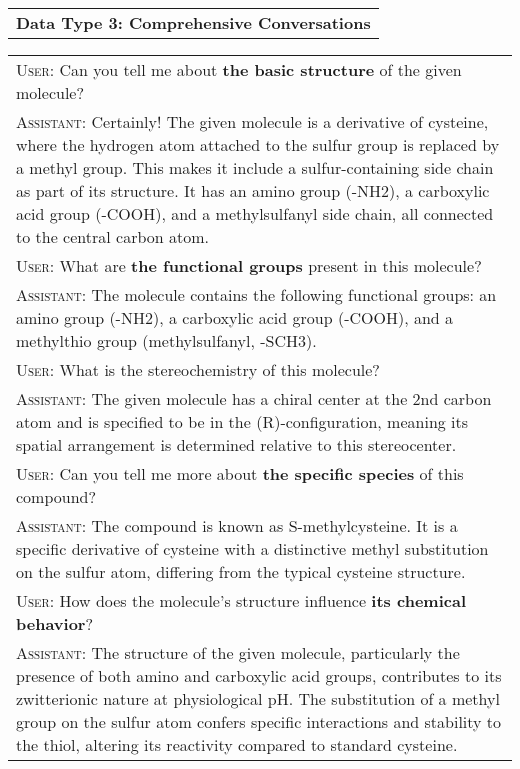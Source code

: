 \begin{table*}[t!]
\begin{tcolorbox}[colframe=gray,colback=white,boxrule=1pt,arc=0.6em,boxsep=0mm,left=5.pt,right=15pt]
\renewcommand{\arraystretch}{1.4}
\begin{tabular}{p{}}
    \textcolor{figgreen}{\textbf{\normalsize{Data Type 3: Comprehensive Conversations}}} \\
\end{tabular}

\renewcommand{\arraystretch}{1.2}
\begin{tabular}{p{}}
\textsc{User}: Can you tell me about\textbf{ the basic structure} of the given molecule?\\
\textsc{Assistant}: Certainly! The given molecule is a derivative of cysteine, where the hydrogen atom attached to the sulfur group is replaced by a methyl group. This makes it include a sulfur-containing side chain as part of its structure. It has an amino group (-NH2), a carboxylic acid group (-COOH), and a methylsulfanyl side chain, all connected to the central carbon atom. \\

\textsc{User}: What are \textbf{the functional groups} present in this molecule? \\
\textsc{Assistant}: The molecule contains the following functional groups: an amino group (-NH2), a carboxylic acid group (-COOH), and a methylthio group (methylsulfanyl, -SCH3). \\

\textsc{User}: What is the stereochemistry of this molecule? \\
\textsc{Assistant}: The given molecule has a chiral center at the 2nd carbon atom and is specified to be in the (R)-configuration, meaning its spatial arrangement is determined relative to this stereocenter. \\

\textsc{User}: Can you tell me more about \textbf{the specific species} of this compound?\\
\textsc{Assistant}: The compound is known as S-methylcysteine. It is a specific derivative of cysteine with a distinctive methyl substitution on the sulfur atom, differing from the typical cysteine structure.\\

\textsc{User}: How does the molecule's structure influence \textbf{its chemical behavior}?\\
\textsc{Assistant}: The structure of the given molecule, particularly the presence of both amino and carboxylic acid groups, contributes to its zwitterionic nature at physiological pH. The substitution of a methyl group on the sulfur atom confers specific interactions and stability to the thiol, altering its reactivity compared to standard cysteine.\\


\end{tabular}
\end{tcolorbox}
\end{table*}

